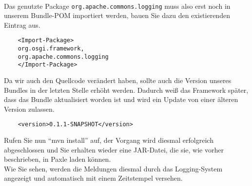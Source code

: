 \documentclass[a4paper,12pt]{scrartcl}
\begin{document}
\\
Das genutzte Package \lstinline[breaklines=false, basicstyle=\itshape]|org.apache.commons.logging| muss also erst noch in unserem Bundle-POM importiert werden, bauen Sie dazu den existierenden Eintrag aus.
\begin{lstlisting}
	<Import-Package>
	org.osgi.framework,
	org.apache.commons.logging
	</Import-Package>
\end{lstlisting}
Da wir auch den Quellcode verändert haben, sollte auch die Version unseres Bundles in der letzten Stelle erhöht werden. Dadurch weiß das Framework später, dass das Bundle aktualisiert worden ist und wird ein Update von einer älteren Version zulassen.
\begin{lstlisting}
	<version>0.1.1-SNAPSHOT</version>
\end{lstlisting}
Rufen Sie nun "`mvn install"' auf, der Vorgang wird diesmal erfolgreich abgeschlossen und Sie erhalten wieder eine JAR-Datei, die sie, wie vorher beschrieben, in Paxle laden können.\\
Wie Sie sehen, werden die Meldungen diesmal durch das Logging-System angezeigt und automatisch mit einem Zeitstempel versehen.
\end{document}
